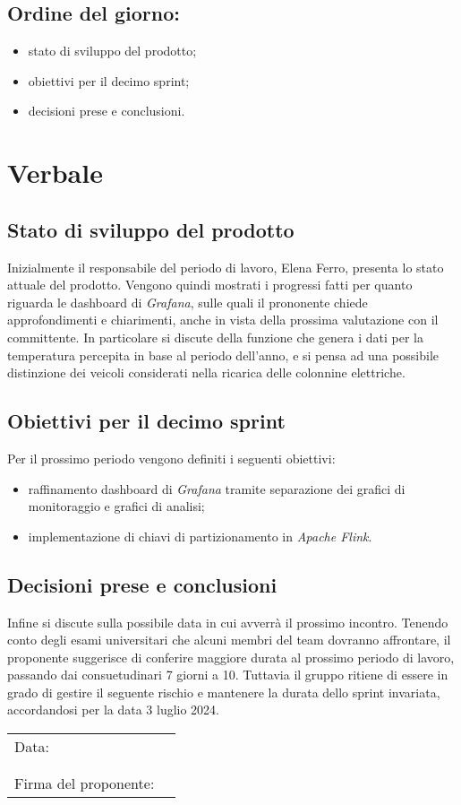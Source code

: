 \documentclass[italian,12pt]{article}
\begin{document}
\subsection*{Ordine del giorno:}
\begin{itemize}
	\item stato di sviluppo del prodotto;
	\item obiettivi per il decimo sprint;
	\item decisioni prese e conclusioni.
\end{itemize}

\newpage

\section{Verbale}

\subsection{Stato di sviluppo del prodotto}
Inizialmente il responsabile del periodo di lavoro, Elena Ferro, presenta lo stato attuale del prodotto. Vengono quindi mostrati i progressi fatti
per quanto riguarda le dashboard di \textit{Grafana}, sulle quali il prononente chiede approfondimenti e chiarimenti, anche in vista della prossima valutazione con
il committente. In particolare si discute della funzione che genera i dati per la temperatura percepita in base al periodo dell'anno, e si pensa ad una possibile
distinzione dei veicoli considerati nella ricarica delle colonnine elettriche.

\subsection{Obiettivi per il decimo sprint}
Per il prossimo periodo vengono definiti i seguenti obiettivi:
\begin{itemize}
	\item raffinamento dashboard di \textit{Grafana} tramite separazione dei grafici di monitoraggio e grafici di analisi;
	\item implementazione di chiavi di partizionamento in \textit{Apache Flink}.
\end{itemize}

\subsection{Decisioni prese e conclusioni}
Infine si discute sulla possibile data in cui avverrà il prossimo incontro. Tenendo conto degli esami universitari che alcuni membri del team dovranno affrontare,
il proponente suggerisce di conferire maggiore durata al prossimo periodo di lavoro, passando dai consuetudinari 7 giorni a 10. Tuttavia il gruppo
ritiene di essere in grado di gestire il seguente rischio e mantenere la durata dello sprint invariata, accordandosi per la data 3 luglio 2024.

\begin{table}[b]
	\begin{tabular}{@{}p{5cm}p{10cm}@{}}
		Data:                 & \hrulefill \\
		                      &            \\
		                      &            \\
		Firma del proponente: & \hrulefill \\
	\end{tabular}
\end{table}
\end{document}
